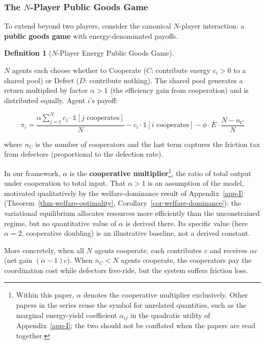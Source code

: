 \documentclass[11pt]{article}
\theoremstyle{plain}
\theoremstyle{definition}
\newtheorem{definition}{Definition}
\theoremstyle{remark}
\let\origsubsubsection\subsubsection
\renewcommand{\subsubsection}{\needspace{4\baselineskip}\origsubsubsection}
\begin{document}
\subsubsection{\texorpdfstring{The \(N\)-Player Public Goods
Game}{The N-Player Public Goods Game}}\label{the-n-player-public-goods-game}

To extend beyond two players, consider the canonical \(N\)-player
interaction: a \textbf{public goods game} with energy-denominated
payoffs.

\begin{definition}[$N$-Player Energy Public Goods Game]
\label{def-n-player-public-goods}

$N$ agents each choose whether to Cooperate ($C$: contribute energy $c_i > 0$ to a shared pool) or Defect ($D$: contribute nothing). The shared pool generates a return multiplied by factor $\alpha > 1$ (the efficiency gain from cooperation) and is distributed equally. Agent $i$'s payoff:

$$\pi_i = \frac{\alpha \sum_{j=1}^{N} c_j \cdot \mathds{1}[j \text{ cooperates}]}{N} - c_i \cdot \mathds{1}[i \text{ cooperates}] - \phi \cdot \bar{E} \cdot \frac{N - n_C}{N}$$

where $n_C$ is the number of cooperators and the last term captures the friction tax from defectors (proportional to the defection rate).
\end{definition}

In our framework, \(\alpha\) is the \textbf{cooperative
multiplier}\footnote{Within this paper, \(\alpha\) denotes the
  cooperative multiplier exclusively. Other papers in the series reuse
  the symbol for unrelated quantities, such as the marginal energy-yield
  coefficient \(\alpha_{ij}\) in the quadratic utility of
  Appendix~\ref{app-I}; the two should not be conflated when the papers
  are read together.}, the ratio of total output under cooperation to
total input. That \(\alpha > 1\) is an assumption of the model,
motivated qualitatively by the welfare-dominance result of
Appendix~\ref{app-I} (Theorem~\ref{thm-welfare-optimality},
Corollary~\ref{cor-welfare-dominance}): the variational equilibrium
allocates resources more efficiently than the unconstrained regime, but
no quantitative value of \(\alpha\) is derived there. Its specific value
(here \(\alpha = 2\), cooperative doubling) is an illustrative baseline,
not a derived constant.

More concretely, when all \(N\) agents cooperate, each contributes \(c\)
and receives \(\alpha c\) (net gain \((\alpha - 1)c\)). When \(n_C < N\)
agents cooperate, the cooperators pay the coordination cost while
defectors free-ride, but the system suffers friction loss.
\end{document}
